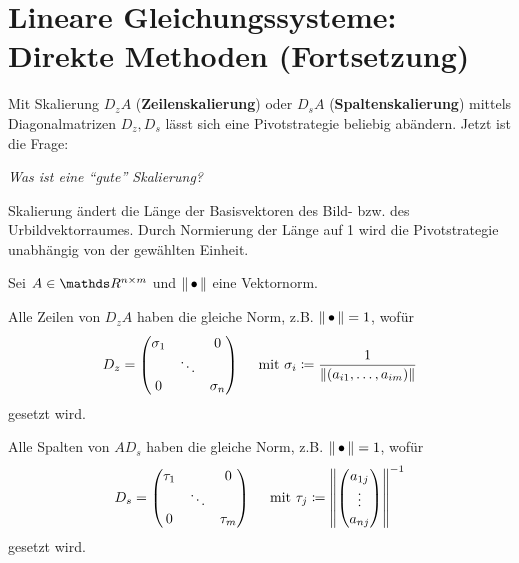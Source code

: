 % 
% 
% 
% 



\chapter{Lineare Gleichungssysteme: Direkte Methoden (Fortsetzung)}


Mit Skalierung $D_zA$ (\textbf{Zeilenskalierung}) oder
$D_sA$ (\textbf{Spaltenskalierung})
mittels Diagonalmatrizen $D_z, D_s$ 
lässt sich eine Pivotstrategie beliebig abändern.
Jetzt ist die Frage:

\textit{Was ist eine \enquote{gute} Skalierung?}

Skalierung ändert die Länge der Basisvektoren 
des Bild- bzw. des Urbildvektorraumes.
Durch Normierung der Länge auf 1 
wird die Pivotstrategie unabhängig von der gewählten Einheit.

Sei $A\in\Renm $ und $\left\| \,\bullet\, \right\| $ eine Vektornorm.

 
Alle Zeilen von $D_zA$ haben die gleiche Norm, z.B. $\left\| \,\bullet\, \right\| =1$, wofür 
\begin{gather}
  D_z = \begin{pmatrix}
    \sigma_1 & & 0 \\
    &\ddots & \\ 
    0 && \sigma_n
  \end{pmatrix}
  \quad \text{ mit }\sigma_i\coloneqq \frac{1}{\nn[(a_{i1}, \dotsc , a_{im})]}
  \label{IV.1.1}
\end{gather}
gesetzt wird.


 
Alle Spalten von $AD_s$ haben die gleiche Norm, z.B. $\left\| \,\bullet\, \right\| =1$, wofür 
\begin{gather}
  D_s = \begin{pmatrix}
    \tau_1 & & 0 \\
    &\ddots & \\ 
    0 && \tau_m
  \end{pmatrix}
  \quad \text{ mit }\tau_j\coloneqq \nn[\begin{pmatrix}
    a_{1j} \\ \vdots \\ a_{nj}
  \end{pmatrix}]^{-1}
  \label{IV.1.2}
\end{gather}
gesetzt wird.

